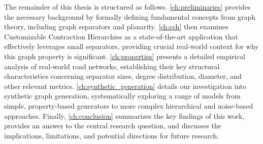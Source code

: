 The remainder of this thesis is structured as follows.
\cref{ch:preliminaries} provides the necessary background by formally defining fundamental concepts from graph theory, including graph separators and planarity.
\cref{ch:cch} then examines Customizable Contraction Hierarchies as a state-of-the-art application that effectively leverages small separators, providing crucial real-world context for why this graph property is significant.
\cref{ch:properties} presents a detailed empirical analysis of real-world road networks, establishing their key structural characteristics concerning separator sizes, degree distribution, diameter, and other relevant metrics.
\cref{ch:synthetic_generation} details our investigation into synthetic graph generation, systematically exploring a range of models from simple, property-based generators to more complex hierarchical and noise-based approaches.
Finally, \cref{ch:conclusion} summarizes the key findings of this work, provides an answer to the central research question, and discusses the implications, limitations, and potential directions for future research.
